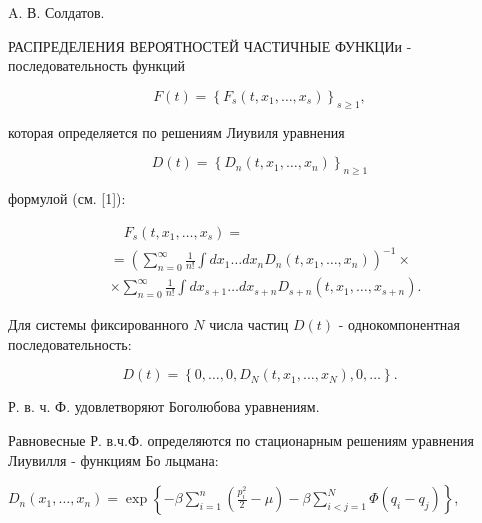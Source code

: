 \documentclass[10pt]{article}
\begin{document}
A. В. Солдатов.



РАСПРЕДЕЛЕНИЯ ВЕРОЯТНОСТЕЙ ЧАСТИЧНЫЕ ФУНКЦИи - последовательность функций



\[

F(t)=\left\{F_{s}\left(t, x_{1}, \ldots, x_{s}\right)\right\}_{s \geqslant 1},

\]



которая определяется по решениям Лиувиля уравнения



\[

D(t)=\left\{D_{n}\left(t, x_{1}, \ldots, x_{n}\right)\right\}_{n \geqslant 1}

\]



формулой (см. [1]):



\[

\begin{aligned}

& \quad F_{s}\left(t, x_{1}, \ldots, x_{s}\right)= \\

& =\left(\sum_{n=0}^{\infty} \frac{1}{n !} \int d x_{1} \ldots d x_{n} D_{n}\left(t, x_{1}, \ldots, x_{n}\right)\right)^{-1} \times \\

& \times \sum_{n=0}^{\infty} \frac{1}{n !} \int d x_{s+1} \ldots d x_{s+n} D_{s+n}\left(t, x_{1}, \ldots, x_{s+n}\right) .

\end{aligned}

\]



Для системы фиксированного $N$ числа частиц $D(t)$ - однокомпонентная последовательность:



\[

D(t)=\left\{0, \ldots, 0, D_{N}\left(t, x_{1}, \ldots, x_{N}\right), 0, \ldots\right\} .

\]



Р. в. ч. Ф. удовлетворяют Боголюбова уравнениям.



Равновесные Р. в.ч.Ф. определяются по стационарным решениям уравнения Лиувилля - функциям Бо льцмана:



$D_{n}\left(x_{1}, \ldots, x_{n}\right)=\exp \left\{-\beta \sum_{i=1}^{n}\left(\frac{p_{i}^{2}}{2}-\mu\right)-\beta \sum_{i<j=1}^{N} \Phi\left(q_{i}-q_{j}\right)\right\}$,
\end{document}
